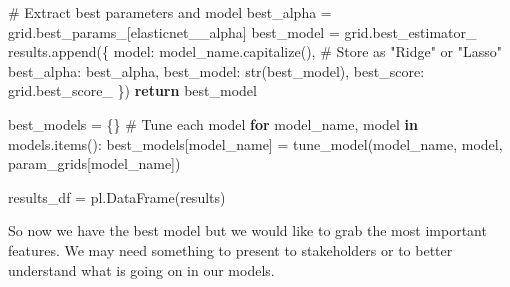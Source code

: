 \documentclass[
  letterpaper,
  DIV=11,
  numbers=noendperiod]{scrreprt}
\newenvironment{Shaded}{\begin{snugshade}}{\end{snugshade}}
\newcommand{\BuiltInTok}[1]{\textcolor[rgb]{0.00,0.23,0.31}{#1}}
\newcommand{\CommentTok}[1]{\textcolor[rgb]{0.37,0.37,0.37}{#1}}
\newcommand{\ControlFlowTok}[1]{\textcolor[rgb]{0.00,0.23,0.31}{\textbf{#1}}}
\newcommand{\KeywordTok}[1]{\textcolor[rgb]{0.00,0.23,0.31}{\textbf{#1}}}
\newcommand{\NormalTok}[1]{\textcolor[rgb]{0.00,0.23,0.31}{#1}}
\newcommand{\OperatorTok}[1]{\textcolor[rgb]{0.37,0.37,0.37}{#1}}
\newcommand{\StringTok}[1]{\textcolor[rgb]{0.13,0.47,0.30}{#1}}
\begin{document}
\begin{Shaded}
\begin{Highlighting}[]
    \CommentTok{\# Extract best parameters and model}
\NormalTok{    best\_alpha }\OperatorTok{=}\NormalTok{ grid.best\_params\_[}\StringTok{\textquotesingle{}elasticnet\_\_alpha\textquotesingle{}}\NormalTok{]}
\NormalTok{    best\_model }\OperatorTok{=}\NormalTok{ grid.best\_estimator\_}
\NormalTok{    results.append(\{}
        \StringTok{\textquotesingle{}model\textquotesingle{}}\NormalTok{: model\_name.capitalize(),  }\CommentTok{\# Store as "Ridge" or "Lasso"}
        \StringTok{\textquotesingle{}best\_alpha\textquotesingle{}}\NormalTok{: best\_alpha,}
        \StringTok{\textquotesingle{}best\_model\textquotesingle{}}\NormalTok{: }\BuiltInTok{str}\NormalTok{(best\_model),}
        \StringTok{\textquotesingle{}best\_score\textquotesingle{}}\NormalTok{: grid.best\_score\_}
\NormalTok{    \})}
    \ControlFlowTok{return}\NormalTok{ best\_model}
    
\NormalTok{best\_models }\OperatorTok{=}\NormalTok{ \{\}}
\CommentTok{\# Tune each model}
\ControlFlowTok{for}\NormalTok{ model\_name, model }\KeywordTok{in}\NormalTok{ models.items():}
\NormalTok{    best\_models[model\_name] }\OperatorTok{=}\NormalTok{ tune\_model(model\_name, model, param\_grids[model\_name])}


\NormalTok{results\_df }\OperatorTok{=}\NormalTok{ pl.DataFrame(results)}
\end{Highlighting}
\end{Shaded}

So now we have the best model but we would like to grab the most
important features. We may need something to present to stakeholders or
to better understand what is going on in our models.
\end{document}
